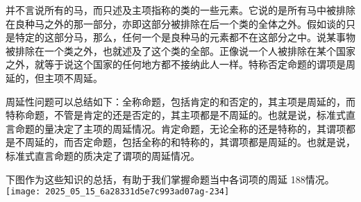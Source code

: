 并不言说所有的马，而只述及主项指称的类的一些元素。它说的是所有马中被排除在良种马之外的那一部分，亦即这部分被排除在后一个类的全体之外。假如谈的只是特定的这部分马，那么，任何一个是良种马的元素都不在这部分之中。说某事物被排除在一个类之外，也就述及了这个类的全部。正像说一个人被排除在某个国家之外，就等于说这个国家的任何地方都不接纳此人一样。特称否定命题的谓项是周延的，但主项不周延。

周延性问题可以总结如下：全称命题，包括肯定的和否定的，其主项是周延的，而特称命题，不管是肯定的还是否定的，其主项都是不周延的。也就是说，标准式直言命题的量决定了主项的周延情况。肯定命题，无论全称的还是特称的，其谓项都是不周延的，而否定命题，包括全称的和特称的，其谓项都是周延的。也就是说，标准式直言命题的质决定了谓项的周延情况。

下图作为这些知识的总括，有助于我们掌握命题当中各词项的周延 188情况。\\
\texttt{[image: 2025\_05\_15\_6a28331d5e7c993ad07ag-234]} 